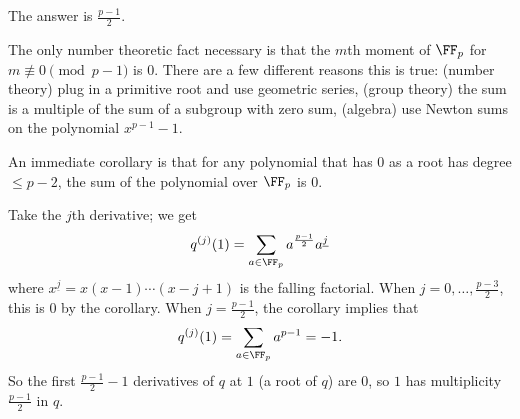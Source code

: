 The answer is $\boxed{\frac{p-1}{2}}$.

The only number theoretic fact necessary is that the $m$th moment of $\FF_p$ for $m\not\equiv0\pmod{p-1}$ is $0$. There are a few different reasons this is true: (number theory) plug in a primitive root and use geometric series, (group theory) the sum is a multiple of the sum of a subgroup with zero sum, (algebra) use Newton sums on the polynomial $x^{p-1}-1$.

An immediate corollary is that for any polynomial that has $0$ as a root has degree $\leq p-2$, the sum of the polynomial over $\FF_p$ is $0$.

Take the $j$th derivative; we get
\[
	q^{(j)}(1)=\sum_{a\in\FF_p}a^{\frac{p-1}{2}}a^{\underline{j}}
\]
where $x^{\underline{j}}=x(x-1)\cdots(x-j+1)$ is the falling factorial. When $j=0,\ldots,\frac{p-3}{2}$, this is $0$ by the corollary. When $j=\frac{p-1}{2}$, the corollary implies that
\[
	q^{(j)}(1)=\sum_{a\in\FF_p}a^{p-1}=-1.
\]
So the first $\frac{p-1}{2}-1$ derivatives of $q$ at $1$ (a root of $q$) are $0$, so $1$ has multiplicity $\frac{p-1}{2}$ in $q$.